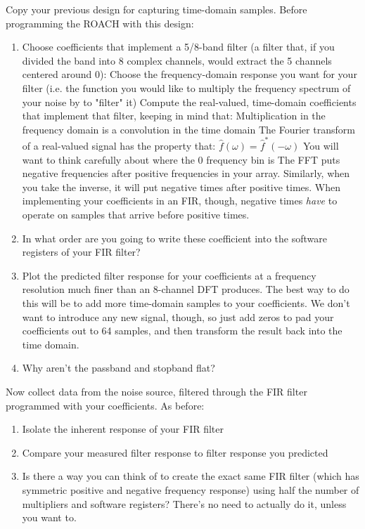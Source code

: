 \documentclass[11pt]{article}
\begin{document}
Copy your previous design for capturing time-domain samples.  Before programming the ROACH with this design:
\begin{enumerate}
\item Choose coefficients that implement a 5/8-band filter (a filter that, if you divided the band into 8 complex
channels, would extract the 5 channels centered around 0):
\subitem Choose the frequency-domain response you want for your filter (i.e. the function you would like to multiply
the frequency spectrum of your noise by to "filter" it)
\subitem Compute the real-valued, time-domain coefficients that implement that filter, keeping in mind that: 
\subsubitem Multiplication in the frequency domain is a convolution in the time domain
\subsubitem The Fourier transform of a real-valued signal has the property that:
$\hat f(\omega) = \hat f^*(-\omega)$
\subsubitem You will want to think carefully about where the 0 frequency bin is
\subsubitem The FFT puts negative frequencies after positive frequencies in your array.  Similarly, when you take the inverse, it will put negative times after positive times.  When implementing your coefficients in an FIR, though, negative times {\it have} to operate on samples that arrive before positive times.
\item In what order are you going to write these coefficient into the software registers of your FIR filter?
\item Plot the predicted filter response for your coefficients at a frequency resolution much finer than an 8-channel
DFT produces.  The best way to do this will be to add more time-domain samples to your coefficients.  We don't want to introduce any new signal, though, so just add zeros to pad your coefficients out to 64 samples, and then transform the result back into the time domain.  
\item Why aren't the passband and stopband flat?
\end{enumerate}

Now collect data from the noise source, filtered through the FIR filter programmed with your coefficients.  As before:
\begin{enumerate}
\item Isolate the inherent response of your FIR filter
\item Compare your measured filter response to filter response you predicted
\item Is there a way you can think of to create the exact same FIR filter (which has symmetric positive and negative
frequency response) using half the number of multipliers and software registers?  There's no need to actually do it,
unless you want to.
\end{enumerate}
\end{document}
